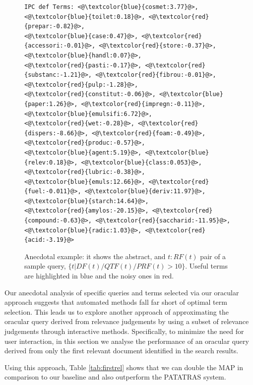 \begin{figure}[t!]
\begin{framed}
\begin{lstlisting}[basicstyle=\scriptsize\ttfamily , linewidth=\columnwidth,breaklines=true]
IPC def Terms: <@\textcolor{blue}{cosmet:3.77}@>, <@\textcolor{blue}{toilet:0.18}@>, <@\textcolor{red}{prepar:-0.82}@>, 
<@\textcolor{blue}{case:0.47}@>, <@\textcolor{red}{accessori:-0.01}@>, <@\textcolor{red}{store:-0.37}@>, <@\textcolor{blue}{handl:0.07}@>, 
<@\textcolor{red}{pasti:-0.17}@>, <@\textcolor{red}{substanc:-1.21}@>, <@\textcolor{red}{fibrou:-0.01}@>, <@\textcolor{red}{pulp:-1.28}@>, 
<@\textcolor{red}{constitut:-0.06}@>, <@\textcolor{blue}{paper:1.26}@>, <@\textcolor{red}{impregn:-0.11}@>, <@\textcolor{blue}{emulsifi:6.72}@>, 
<@\textcolor{red}{wet:-0.28}@>, <@\textcolor{red}{dispers:-8.66}@>, <@\textcolor{red}{foam:-0.49}@>, <@\textcolor{red}{produc:-0.57}@>, 
<@\textcolor{blue}{agent:5.19}@>, <@\textcolor{blue}{relev:0.18}@>, <@\textcolor{blue}{class:0.053}@>, <@\textcolor{red}{lubric:-0.38}@>, 
<@\textcolor{blue}{emuls:12.66}@>, <@\textcolor{red}{fuel:-0.011}@>, <@\textcolor{blue}{deriv:11.97}@>, <@\textcolor{blue}{starch:14.64}@>, 
<@\textcolor{red}{amylos:-20.15}@>, <@\textcolor{red}{compound:-0.63}@>, <@\textcolor{red}{saccharid:-11.95}@>, 
<@\textcolor{blue}{radic:1.03}@>, <@\textcolor{red}{acid:-3.19}@> 
 \end{lstlisting} 
 \vspace*{-2ex}
\end{framed}
 \vspace*{-2ex}
  \caption{Anecdotal example: it shows the abstract, and $ t:RF(t) $ pair of a sample query, $\{t|DF(t)/QTF(t)/PRF(t)>10\}$. Useful terms are highlighted in blue and the noisy ones in red.}
  \label{fig:anecdotal}  
\end{figure}

Our anecdotal analysis of specific queries and terms selected via our oracular
approach suggests that automated methods fall far short of optimal term selection.
This leads us to explore another approach of approximating the oracular query
derived from relevance judgements by using a subset of relevance judgements
through interactive methods.  Specifically, to minimize the need for user interaction,
in this section we analyse the performance of an oracular query derived from
only the first relevant document identified in the search results.

Using this approach, Table \ref{tab:firstrel} shows that we can double the MAP in comparison to our baseline and also outperform the PATATRAS system.

